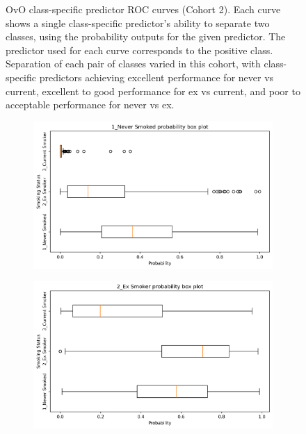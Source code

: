 \documentclass{article} %
\begin{document}
\begin{figure}[p]
\begin{subfigure}{0.46\linewidth}
    \end{subfigure}
    \caption[Class-specific predictor ROC curves (Cohort 2)]{OvO class-specific predictor ROC curves (Cohort 2). Each curve shows a single class-specific predictor's ability to separate two classes, using the probability outputs for the given predictor. The predictor used for each curve corresponds to the positive class. Separation of each pair of classes varied in this cohort, with class-specific predictors achieving excellent performance for never vs current, excellent to good performance for ex vs current, and poor to acceptable performance for never vs ex.}
    \label{fig:cohort2-initial-rocs}
\end{figure}

\begin{figure}[p]
    \centering
    \begin{subfigure}{0.75\linewidth}
        \centering
        \includegraphics[width=\linewidth]{cohort2/test_boxplot_1.png}
    \end{subfigure}
    \begin{subfigure}{0.75\linewidth}
        \centering
        \includegraphics[width=\linewidth]{cohort2/test_boxplot_2.png}

\end{subfigure}
\end{figure}
\end{document}
